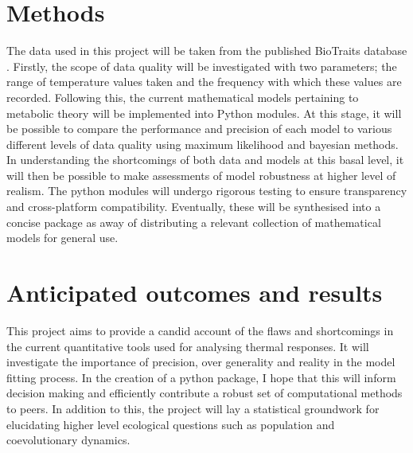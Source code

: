 \documentclass[
11pt, %
onehalfspacing, %
parskip, %
headsepline, %
]{article} %
\begin{document}
\begin{linenumbers}
\section*{Methods}
The data used in this project will be taken from the published BioTraits database \citep{Dell2013}. Firstly, the scope of data quality will be investigated with two parameters; the range of temperature values taken and the frequency with which these values are recorded. Following this, the current mathematical models pertaining to metabolic theory will be implemented into Python modules. At this stage, it will be possible to compare the performance and precision of each model to various different levels of data quality using maximum likelihood and bayesian methods. In understanding the shortcomings of both data and models at this basal level, it will then be possible to make assessments of model robustness at higher level of realism. The python modules will undergo rigorous testing to ensure transparency and cross-platform compatibility. Eventually, these will be synthesised into a concise package as away of distributing a relevant collection of mathematical models for general use.

\maketitle
\section*{Anticipated outcomes and results}
This project aims to provide a candid account of the flaws and shortcomings in the current quantitative tools used for analysing thermal responses. It will investigate the importance of precision, over generality and reality in the model fitting process. In the creation of a python package, I hope that this will inform decision making and efficiently contribute a robust set of computational methods to peers. In addition to this, the project will lay a statistical groundwork for elucidating higher level ecological questions such as population and coevolutionary dynamics.

\maketitle

\end{linenumbers}
\end{document}
